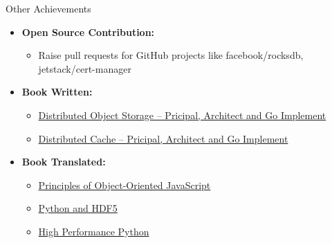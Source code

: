 \documentclass[11pt,oneside]{article}
\newenvironment{ressection}[1]{
	\vspace{4pt}
	{\selectfont\Large#1}
	\begin{itemize}
	\vspace{3pt}
}{
	\end{itemize}
}
\newcommand{\resitem}[1]{
	\vspace{-4pt}
	\item \begin{flushleft} #1 \end{flushleft}
}
\newcommand{\ressubitem}[1]{
	\vspace{-1pt}
	\item \begin{flushleft} #1 \end{flushleft}
}
\newenvironment{reslist}[1]{
	\resitem{\textbf{#1}}
	\vspace{-5pt}
	\begin{itemize}
}{
	\end{itemize}
}
\begin{document}
\begin{ressection}{Other Achievements}

	\begin{reslist}{Open Source Contribution:}
	        \ressubitem{Raise pull requests for GitHub projects like facebook/rocksdb, jetstack/cert-manager}
	\end{reslist}

	\begin{reslist}{Book Written:}
	        \ressubitem{\href{https://item.jd.com/60796801160.html}{Distributed Object Storage -- Pricipal, Architect and Go Implement}}
	        \ressubitem{\href{https://item.jd.com/12495484.html}{Distributed Cache -- Pricipal, Architect and Go Implement}}
	\end{reslist}

	\begin{reslist}{Book Translated:}
		\ressubitem{\href{https://item.jd.com/11667775.html}{Principles of Object-Oriented JavaScript}}
		\ressubitem{\href{https://item.jd.com/10057226048416.html}{Python and HDF5}}
		\ressubitem{\href{https://item.jd.com/13187369.html}{High Performance Python}}
	\end{reslist}

\end{ressection}
\end{document}
